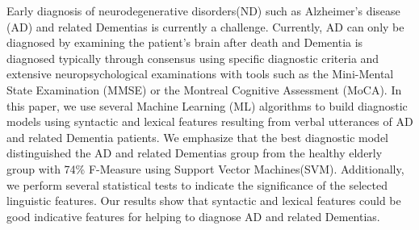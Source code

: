 Early diagnosis of neurodegenerative disorders(ND) such as Alzheimer's disease (AD) and related Dementias is currently a challenge. Currently, AD can only be diagnosed by examining the patient's brain after death and Dementia is diagnosed typically through consensus using specific diagnostic criteria and extensive neuropsychological examinations with tools such as the Mini-Mental State Examination (MMSE) or the Montreal Cognitive Assessment (MoCA). In this paper, we use several Machine Learning (ML) algorithms to build diagnostic models using syntactic and lexical features resulting from verbal utterances of AD and related Dementia patients. We emphasize that the best diagnostic model distinguished the AD and related Dementias group from the healthy elderly group with 74\% F-Measure using Support Vector Machines(SVM). Additionally, we perform several statistical tests to indicate the significance of the selected linguistic features. Our results show that syntactic and lexical features could be good indicative features for helping to diagnose AD and related Dementias.
